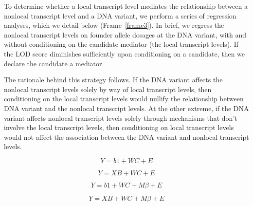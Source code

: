 \documentclass[oneside]{book}\usepackage[]{graphicx}\usepackage[]{color}
\newenvironment{frameenv}[1]
    {\begin{myfloat}[tb]
    \begin{mdframed}[roundcorner=10pt,backgroundcolor=blue!10]
    \caption{#1}
    }
    {%
    \end{mdframed}\end{myfloat}
    }
\begin{document}
To determine whether a local transcript level mediates the relationship between 
a nonlocal transcript level and a DNA variant, we perform a series of regression analyses, 
which we detail below (Frame~\ref{frame3}). 
In brief, we regress the nonlocal transcript levels on founder allele dosages at the DNA 
variant, with and without conditioning on the candidate mediator (the local transcript levels). 
If the LOD score diminishes sufficiently upon conditioning on a candidate, 
then we declare the candidate a mediator.

The rationale behind this strategy follows. 
If the DNA variant affects the nonlocal transcript levels solely by way of local 
transcript levels, then conditioning on the local transcript levels would nullify the relationship between DNA variant and the nonlocal transcript levels. 
At the other extreme, if the DNA variant affects nonlocal transcript levels solely 
through mechanisms that don't involve the local transcript levels, then conditioning 
on local transcript levels would not affect the association between the DNA variant and nonlocal transcript levels.




\begin{frameenv}{Four regressions for a single mediation analysis}\label{frame3}


\begin{equation}
Y = b1 + WC + E
\label{model1}
\end{equation}

\begin{equation}
Y = XB + WC + E
\label{model2}
\end{equation}

\begin{equation}
Y = b1 + WC + M\beta + E
\label{model3}
\end{equation}

\begin{equation}
Y = XB + WC + M\beta + E
\label{model4}
\end{equation}
\end{frameenv}
\end{document}
